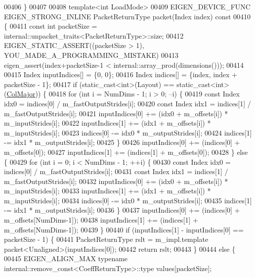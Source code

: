 \begin{DoxyCode}
00406   \}
00407 
00408   \textcolor{keyword}{template}<\textcolor{keywordtype}{int} LoadMode>
00409   EIGEN\_DEVICE\_FUNC EIGEN\_STRONG\_INLINE PacketReturnType packet(Index index)\textcolor{keyword}{ const}
00410 \textcolor{keyword}{  }\{
00411     \textcolor{keyword}{const} \textcolor{keywordtype}{int} packetSize = internal::unpacket\_traits<PacketReturnType>::size;
00412     EIGEN\_STATIC\_ASSERT((packetSize > 1), YOU\_MADE\_A\_PROGRAMMING\_MISTAKE)
00413     eigen\_assert(index+packetSize-1 < internal::array\_prod(dimensions()));
00414 
00415     Index inputIndices[] = \{0, 0\};
00416     Index indices[] = \{index, index + packetSize - 1\};
00417     \textcolor{keywordflow}{if} (static\_cast<int>(Layout) == static\_cast<int>(\hyperlink{group__enums_ggaacded1a18ae58b0f554751f6cdf9eb13a0cbd4bdd0abcfc0224c5fcb5e4f6669a}{ColMajor})) \{
00418       \textcolor{keywordflow}{for} (\textcolor{keywordtype}{int} i = NumDims - 1; i > 0; --i) \{
00419         \textcolor{keyword}{const} Index idx0 = indices[0] / m\_fastOutputStrides[i];
00420         \textcolor{keyword}{const} Index idx1 = indices[1] / m\_fastOutputStrides[i];
00421         inputIndices[0] += (idx0 + m\_offsets[i]) * m\_inputStrides[i];
00422         inputIndices[1] += (idx1 + m\_offsets[i]) * m\_inputStrides[i];
00423         indices[0] -= idx0 * m\_outputStrides[i];
00424         indices[1] -= idx1 * m\_outputStrides[i];
00425       \}
00426       inputIndices[0] += (indices[0] + m\_offsets[0]);
00427       inputIndices[1] += (indices[1] + m\_offsets[0]);
00428     \} \textcolor{keywordflow}{else} \{
00429       \textcolor{keywordflow}{for} (\textcolor{keywordtype}{int} i = 0; i < NumDims - 1; ++i) \{
00430         \textcolor{keyword}{const} Index idx0 = indices[0] / m\_fastOutputStrides[i];
00431         \textcolor{keyword}{const} Index idx1 = indices[1] / m\_fastOutputStrides[i];
00432         inputIndices[0] += (idx0 + m\_offsets[i]) * m\_inputStrides[i];
00433         inputIndices[1] += (idx1 + m\_offsets[i]) * m\_inputStrides[i];
00434         indices[0] -= idx0 * m\_outputStrides[i];
00435         indices[1] -= idx1 * m\_outputStrides[i];
00436       \}
00437       inputIndices[0] += (indices[0] + m\_offsets[NumDims-1]);
00438       inputIndices[1] += (indices[1] + m\_offsets[NumDims-1]);
00439     \}
00440     \textcolor{keywordflow}{if} (inputIndices[1] - inputIndices[0] == packetSize - 1) \{
00441       PacketReturnType rslt = m\_impl.template packet<Unaligned>(inputIndices[0]);
00442       \textcolor{keywordflow}{return} rslt;
00443     \}
00444     \textcolor{keywordflow}{else} \{
00445       EIGEN\_ALIGN\_MAX \textcolor{keyword}{typename} internal::remove\_const<CoeffReturnType>::type values[packetSize];

\end{DoxyCode}
